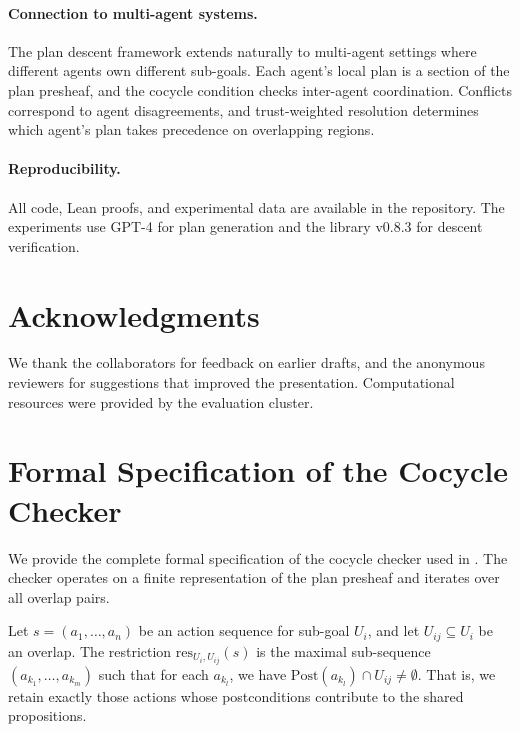 \documentclass[11pt]{article}
\newcommand{\SubGoal}[1]{U_{#1}}
\newcommand{\PostCond}{\mathrm{Post}}
\newcommand{\PlanRes}{\mathrm{res}}
\begin{document}
\paragraph{Connection to multi-agent systems.}
The plan descent framework extends naturally to multi-agent settings
where different agents own different sub-goals.  Each agent's local
plan is a section of the plan presheaf, and the cocycle condition
checks inter-agent coordination.  Conflicts correspond to agent
disagreements, and trust-weighted resolution determines which agent's
plan takes precedence on overlapping regions.

\paragraph{Reproducibility.}
All code, Lean proofs, and experimental data are available in the
\JuGeo{} repository.  The experiments use GPT-4 for plan generation
and the \JuGeo{} \Python{} library v0.8.3 for descent verification.


\section*{Acknowledgments}

We thank the \JuGeo{} collaborators for feedback on earlier drafts,
and the anonymous reviewers for suggestions that improved the
presentation.  Computational resources were provided by the
\JuGeo{} evaluation cluster.



\appendix

\section{Formal Specification of the Cocycle Checker}\label{app:formal}

We provide the complete formal specification of the cocycle
checker used in .  The checker operates
on a finite representation of the plan presheaf and iterates
over all overlap pairs.

\begin{definition}\label{def:restrict-formal}
  Let $s = (a_1, \ldots, a_n)$ be an action sequence for sub-goal
  $\SubGoal{i}$, and let $\SubGoal{ij} \subseteq \SubGoal{i}$ be
  an overlap.  The restriction
  $\PlanRes_{\SubGoal{i}, \SubGoal{ij}}(s)$ is the maximal
  sub-sequence $(a_{k_1}, \ldots, a_{k_m})$ such that for each
  $a_{k_l}$, we have $\PostCond(a_{k_l}) \cap \SubGoal{ij}
  \neq \emptyset$.  That is, we retain exactly those actions
  whose postconditions contribute to the shared propositions.
\end{definition}
\end{document}
